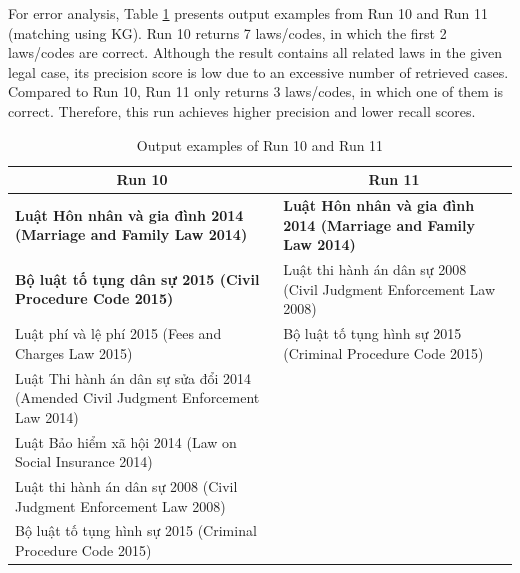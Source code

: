 \documentclass[conference]{IEEEtran}
\begin{document}
For error analysis, Table \ref{tab:output examples} presents output examples from Run 10 and Run 11 (matching using KG). Run 10 returns 7 laws/codes, in which the first 2 laws/codes are correct. Although the result contains all related laws in the given legal case, its precision score is low due to an excessive number of retrieved cases.    
Compared to Run 10, Run 11 only returns 3 laws/codes, in which one of them is correct. Therefore, this run achieves higher precision and lower recall scores.
\begin{table}[ht]
\caption{Output examples of Run 10 and Run 11}
\label{tab:output examples}
\begin{tabular}{|p{4cm}|p{4cm}|}
\hline
\multicolumn{1}{|c|}{\textbf{Run 10}}                                              & \multicolumn{1}{c|}{\textbf{Run 11}}                                     \\ \hline
\textbf{Luật Hôn nhân và gia đình 2014 (Marriage and Family Law 2014)}           & \textbf{Luật Hôn nhân và gia đình 2014 (Marriage and Family Law 2014)} \\ \hline
\textbf{Bộ luật tố tụng dân sự 2015 (Civil Procedure Code 2015) }                           & Luật thi hành án dân sự 2008 (Civil Judgment Enforcement Law 2008)       \\ \hline
Luật phí và lệ phí 2015 (Fees and Charges Law 2015)                                & Bộ luật tố tụng hình sự 2015 (Criminal Procedure Code 2015)              \\ \hline
Luật Thi hành án dân sự sửa đổi 2014 (Amended Civil Judgment Enforcement Law 2014) &                                                                          \\ \hline
Luật Bảo hiểm xã hội 2014 (Law on Social Insurance 2014)                           &                                                                          \\ \hline
Luật thi hành án dân sự 2008 (Civil Judgment Enforcement Law 2008)                 &                                                                          \\ \hline
Bộ luật tố tụng hình sự 2015 (Criminal Procedure Code 2015)                        &                                                                          \\ \hline
\end{tabular}
\end{table}
\end{document}
